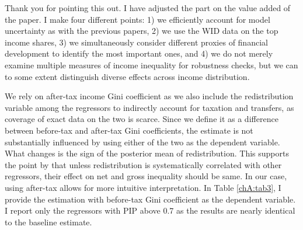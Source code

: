 \begin{enumerate}[resume]
    Thank you for pointing this out. I have adjusted the part on the value added of the paper. I make four different points: 1) we efficiently account for model uncertainty as with the previous papers, 2) we use the \ac{WID} data on the top income shares, 3) we simultaneously consider different proxies of financial development to identify the most important ones, and 4) we do not merely examine multiple measures of income inequality for robustness checks, but we can to some extent distinguish diverse effects across income distribution. 
    
    We rely on after-tax income Gini coefficient as we also include the redistribution variable among the regressors to indirectly account for taxation and transfers, as coverage of exact data on the two is scarce. Since we define it as a difference between before-tax and after-tax Gini coefficients, the estimate is not substantially influenced by using either of the two as the dependent variable. What changes is the sign of the posterior mean of redistribution. This supports the point by \textcite{furceri2019robust} that unless redistribution is systematically correlated with other regressors, their effect on net and gross inequality should be same. In our case, using after-tax allows for more intuitive interpretation. In Table \ref{chA:tab3}, I provide the estimation with before-tax Gini coefficient as the dependent variable. I report only the regressors with \ac{PIP} above 0.7 as the results are nearly identical to the baseline estimate.


\end{enumerate}
